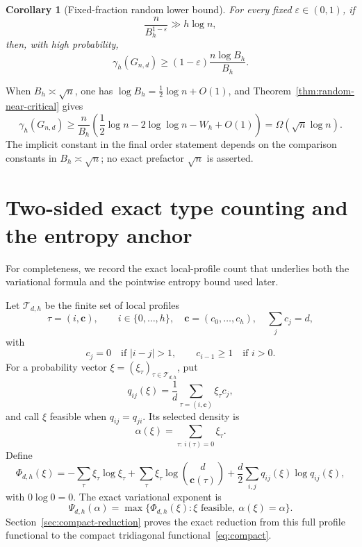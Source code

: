 \documentclass[11pt]{amsart}
\newtheorem{corollary}[theorem]{Corollary}
\theoremstyle{definition}
\newcommand{\eps}{\varepsilon}
\begin{document}
\begin{corollary}[Fixed-fraction random lower bound]\label{cor:random-fixed}
For every fixed $\eps\in(0,1)$, if
\[
 \frac{n}{B_h^{1-\eps}}\gg h\log n,
\]
then, with high probability,
\[
 \gamma_h(G_{n,d})\ge
 (1-\eps)\frac{n\log B_h}{B_h}.
\]
\end{corollary}

When $B_h\asymp\sqrt n$, one has $\log B_h=\tfrac12\log n+O(1)$, and Theorem~\ref{thm:random-near-critical} gives
\[
 \gamma_h(G_{n,d})\ge
 \frac n{B_h}\left(\frac12\log n-2\log\log n-W_h+O(1)\right)
 =\Omega(\sqrt n\log n).
\]
The implicit constant in the final order statement depends on the comparison constants in $B_h\asymp\sqrt n$; no exact prefactor $\sqrt n$ is asserted.


\section{Two-sided exact type counting and the entropy anchor}\label{sec:two-sided-types}
For completeness, we record the exact local-profile count that underlies both the variational formula and the pointwise entropy bound used later.

Let $\mathcal T_{d,h}$ be the finite set of local profiles
\[
 \tau=(i,\mathbf c),\qquad
 i\in\{0,\ldots,h\},\quad
 \mathbf c=(c_0,\ldots,c_h),\quad
 \sum_jc_j=d,
\]
with
\[
 c_j=0\quad\text{if }|i-j|>1,
 \qquad
 c_{i-1}\ge1\quad\text{if }i>0.
\]
For a probability vector $\xi=(\xi_\tau)_{\tau\in\mathcal T_{d,h}}$, put
\[
 q_{ij}(\xi)
 =\frac1d\sum_{\tau=(i,\mathbf c)}\xi_\tau c_j,
\]
and call $\xi$ feasible when $q_{ij}=q_{ji}$.  Its selected density is
\[
 \alpha(\xi)=\sum_{\tau:\,i(\tau)=0}\xi_\tau.
\]
Define
\begin{equation}\label{eq:full-profile-functional}
 \Phi_{d,h}(\xi)
 =-\sum_\tau\xi_\tau\log\xi_\tau
 +\sum_\tau\xi_\tau\log\binom d{\mathbf c(\tau)}
 +\frac d2\sum_{i,j}q_{ij}(\xi)\log q_{ij}(\xi),
\end{equation}
with $0\log0=0$.  The exact variational exponent is
\[
 \Psi_{d,h}(\alpha)
 =\max\{\Phi_{d,h}(\xi):\xi\text{ feasible},\ \alpha(\xi)=\alpha\}.
\]
Section~\ref{sec:compact-reduction} proves the exact reduction from this full profile functional to the compact tridiagonal functional~\eqref{eq:compact}.
\end{document}
